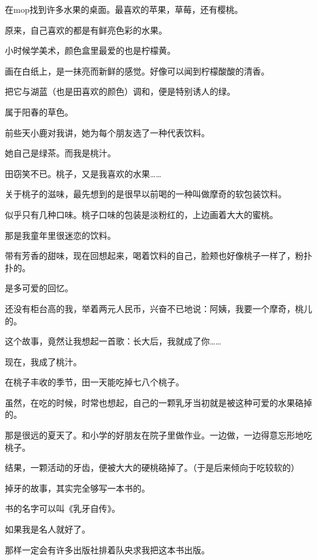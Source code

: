 \documentclass[12pt,a4paper]{article}
\def\blankrev{\vspace{1ex}}									%
\begin{document}
	\endwriting



		在mop找到许多水果的桌面。最喜欢的苹果，草莓，还有樱桃。\par
		原来，自己喜欢的都是有鲜亮色彩的水果。\par
		小时候学美术，颜色盒里最爱的也是柠檬黄。\par
		画在白纸上，是一抹亮而新鲜的感觉。好像可以闻到柠檬酸酸的清香。\par
		把它与湖蓝（也是田喜欢的颜色）调和，便是特别诱人的绿。\par
		属于阳春的草色。

		\blankrev
		前些天小鹿对我讲，她为每个朋友选了一种代表饮料。\par
		她自己是绿茶。而我是桃汁。\par
		田窃笑不已。桃子，又是我喜欢的水果……\par
		关于桃子的滋味，最先想到的是很早以前喝的一种叫做摩奇的软包装饮料。\par
		似乎只有几种口味。桃子口味的包装是淡粉红的，上边画着大大的蜜桃。\par
		那是我童年里很迷恋的饮料。\par
		带有芳香的甜味，现在回想起来，喝着饮料的自己，脸颊也好像桃子一样了，粉扑扑的。\par
		是多可爱的回忆。\par
		还没有柜台高的我，举着两元人民币，兴奋不已地说：阿姨，我要一个摩奇，桃儿的。\par
		这个故事，竟然让我想起一首歌：长大后，我就成了你……

		\blankrev
		现在，我成了桃汁。\par
		在桃子丰收的季节，田一天能吃掉七八个桃子。\par
		虽然，在吃的时候，时常也想起，自己的一颗乳牙当初就是被这种可爱的水果硌掉的。\par
		那是很远的夏天了。和小学的好朋友在院子里做作业。一边做，一边得意忘形地吃桃子。\par
		结果，一颗活动的牙齿，便被大大的硬桃硌掉了。（于是后来倾向于吃较软的）\par
		掉牙的故事，其实完全够写一本书的。\par
		书的名字可以叫《乳牙自传》。\par
		如果我是名人就好了。\par
		那样一定会有许多出版社排着队央求我把这本书出版。

	\endwriting


\end{document}
